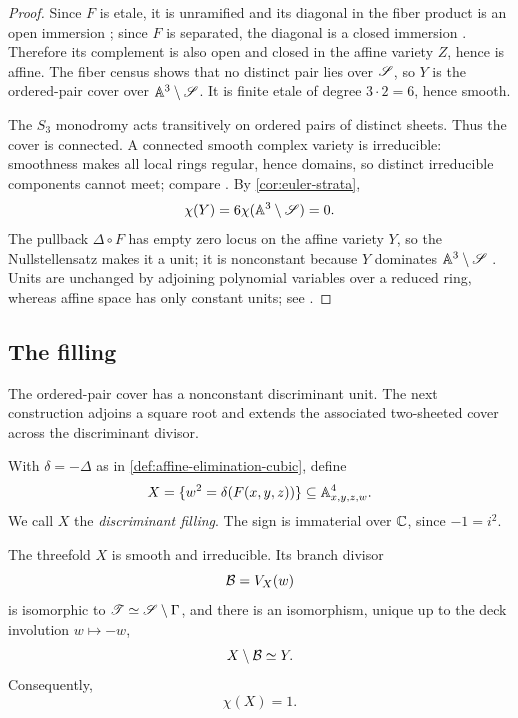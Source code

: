 \begin{proof}
Since $F$ is etale, it is unramified and its diagonal in the fiber product is an open immersion \cite[Tag 02G3, Lemma 29.36.13]{StacksProject}; since $F$ is separated, the diagonal is a closed immersion \cite[Tag 01KK]{StacksProject}.  Therefore its complement is also open and closed in the affine variety $Z$, hence is affine.  The fiber census shows that no distinct pair lies over $\mathscr S$, so $Y$ is the ordered-pair cover over $\mathbb A^3\setminus\mathscr S$.  It is finite etale of degree $3\cdot2=6$, hence smooth.

The $S_3$ monodromy acts transitively on ordered pairs of distinct sheets.  Thus the cover is connected.  A connected smooth complex variety is irreducible: smoothness makes all local rings regular, hence domains, so distinct irreducible components cannot meet; compare \cite[Chapter I, Section 5]{Hartshorne1977}.  By \cref{cor:euler-strata},
\[
  \chi(Y)=6\chi(\mathbb A^3\setminus\mathscr S)=0.
\]
The pullback $\Delta\circ F$ has empty zero locus on the affine variety $Y$, so the Nullstellensatz makes it a unit; it is nonconstant because $Y$ dominates $\mathbb A^3\setminus\mathscr S$ \cite[Chapters 1 and 5]{AtiyahMacdonald}.  Units are unchanged by adjoining polynomial variables over a reduced ring, whereas affine space has only constant units; see \cite[Chapter 1]{AtiyahMacdonald}.
\end{proof}

\subsection{The filling}

The ordered-pair cover has a nonconstant discriminant unit.  The next construction adjoins a square root and extends the associated two-sheeted cover across the discriminant divisor.

\begin{construction}\label{con:discriminant-filling}
With $\delta=-\Delta$ as in \cref{def:affine-elimination-cubic}, define
\begin{equation}\label{eq:X-filling}
  X=\{w^2=\delta(F(x,y,z))\}\subseteq\mathbb A^4_{x,y,z,w}.
\end{equation}
We call $X$ the \emph{discriminant filling}.  The sign is immaterial over $\mathbb C$, since $-1=i^2$.
\end{construction}

\begin{theorem}\label{thm:filling}
The threefold $X$ is smooth and irreducible.  Its branch divisor
\[
  \mathcal B=V_X(w)
\]
is isomorphic to $\mathscr T\simeq\mathscr S\setminus\Gamma$, and there is an isomorphism, unique up to the deck involution $w\mapsto-w$,
\[
  X\setminus\mathcal B\simeq Y.
\]
Consequently,
\[
  \chi(X)=1.
\]
\end{theorem}

